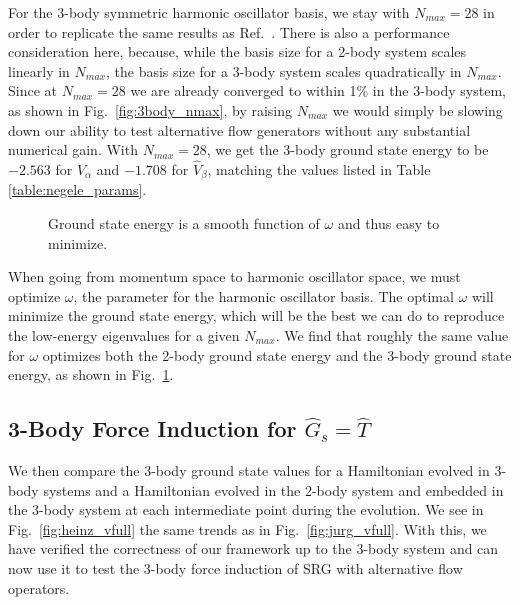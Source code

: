 For the 3-body symmetric harmonic oscillator basis, we stay with $N_{max}=28$ in order to replicate the same results as Ref.~\cite{Jurgenson:2008jp}. There is also a performance consideration here, because, while the basis size for a 2-body system scales linearly in $N_{max}$, the basis size for a 3-body system scales quadratically in $N_{max}$. Since at $N_{max}=28$ we are already converged to within 1\% in the 3-body system, as shown in Fig.~\ref{fig:3body_nmax}, by raising $N_{max}$ we would simply be slowing down our ability to test alternative flow generators without any substantial numerical gain. With $N_{max}=28$, we get the 3-body ground state energy to be $-2.563$ for $\hat{V}_\alpha$ and $-1.708$ for $\hat{V}_\beta$, matching the values listed in Table \ref{table:negele_params}.

\begin{figure}[t]
\begin{center}
\end{center}
\caption{Ground state energy is a smooth function of $\omega$ and thus easy to minimize.}
\label{fig:alpha_w}
\end{figure}

When going from momentum space to harmonic oscillator space, we must optimize $\omega$, the parameter for the harmonic oscillator basis. The optimal $\omega$ will minimize the ground state energy, which will be the best we can do to reproduce the low-energy eigenvalues for a given $N_{max}$. We find that roughly the same value for $\omega$ optimizes both the 2-body ground state energy and the 3-body ground state energy, as shown in Fig.~\ref{fig:alpha_w}.


\subsection{3-Body Force Induction for $\hat{G}_s=\hat{T}$}

We then compare the 3-body ground state values for a Hamiltonian evolved in 3-body systems and a Hamiltonian evolved in the 2-body system and embedded in the 3-body system at each intermediate point during the evolution. We see in Fig.~\ref{fig:heinz_vfull} the same trends as in Fig.~\ref{fig:jurg_vfull}. With this, we have verified the correctness of our framework up to the 3-body system and can now use it to test the 3-body force induction of SRG with alternative flow operators.

